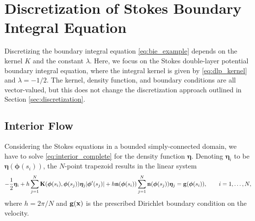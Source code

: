 \section{Discretization of Stokes  Boundary Integral Equation}\label{sec:stokes_disc}

Discretizing the boundary integral equation \eqref{eq:bie_example} depends on the kernel $K$ and the constant $\lambda$. Here, we focus on the Stokes double-layer potential boundary integral equation, where the integral kernel is given by \eqref{eq:dlp_kernel} and $\lambda = -1/2$. The kernel, density function, and boundary conditions are all vector-valued, but this does not change the discretization approach outlined in Section \ref{sec:discretization}.

\subsection{Interior Flow}\label{sec:simply_connected}


Considering the Stokes equations in a bounded simply-connected domain, we have to solve \eqref{eq:interior_complete} for the density function $\bm{\eta}$. Denoting $\bm{\eta}_i$ to be $\bm{\eta}(\bm{\phi}(s_i))$, the $N$-point trapezoid results in the linear system
\[ -\frac{1}{2} \bm{\eta}_i + h \sum\limits_{j=1}^N \mathbf{K}(\bm{\phi}(s_i), \bm{\phi}(s_j))\bm{\eta}_j|\bm{\phi}'(s_j)| + h{\mathbf{n}}(\bm{\phi}(s_i))\sum\limits_{j=1}^N {\mathbf{n}}(\bm{\phi}(s_j))\bm{\eta}_j = \mathbf{g}(\bm{\phi}(s_i)),\qquad i=1,\hdots,N,\]
where $h=2\pi/N$ and $\mathbf{g}({\mathbf{x}})$ is the prescribed Dirichlet boundary condition on the velocity.

